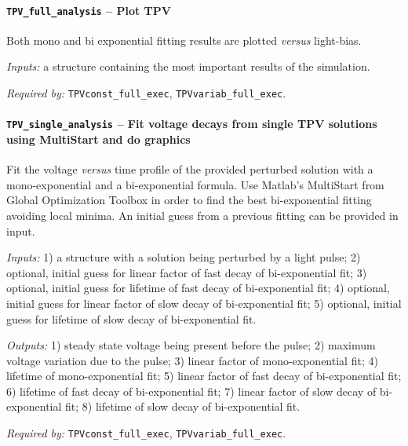 
		\paragraph{\texttt{TPV\_full\_analysis} -- Plot TPV}
		Both mono and bi exponential fitting results are plotted \textsl{versus} light-bias.

		\textit{Inputs:} a structure containing the most important results of the  simulation.



		\textit{Required by:} \texttt{TPV\-const\_full\_exec}, \texttt{TPV\-variab\_full\_exec}.

		\paragraph{\texttt{TPV\_single\_analysis} -- Fit voltage decays from single TPV solutions using MultiStart and do graphics}
		Fit the voltage \textsl{versus} time profile of the provided perturbed solution with a mono\hyp{}exponential and a bi\hyp{}exponential formula.
		Use Matlab's MultiStart from Global Optimization Toolbox in order to find the best bi\hyp{}exponential fitting avoiding local minima.
		An initial guess from a previous fitting can be provided in input.

		\textit{Inputs:} 1) a structure with a solution being perturbed by a light pulse;
		2) optional, initial guess for linear factor of fast decay of bi-exponential fit;
		3) optional, initial guess for lifetime of fast decay of bi-exponential fit;
		4) optional, initial guess for linear factor of slow decay of bi-exponential fit;
		5) optional, initial guess for lifetime of slow decay of bi-exponential fit.

		\textit{Outputs:} 1) steady state voltage being present before the pulse;
		2) maximum voltage variation due to the pulse;
		3) linear factor of mono-exponential fit;
		4) lifetime of mono-exponential fit;
		5) linear factor of fast decay of bi-exponential fit;
		6) lifetime of fast decay of bi-exponential fit;
		7) linear factor of slow decay of bi-exponential fit;
		8) lifetime of slow decay of bi-exponential fit.


		\textit{Required by:} \texttt{TPV\-const\_full\_exec}, \texttt{TPV\-variab\_full\_exec}.

